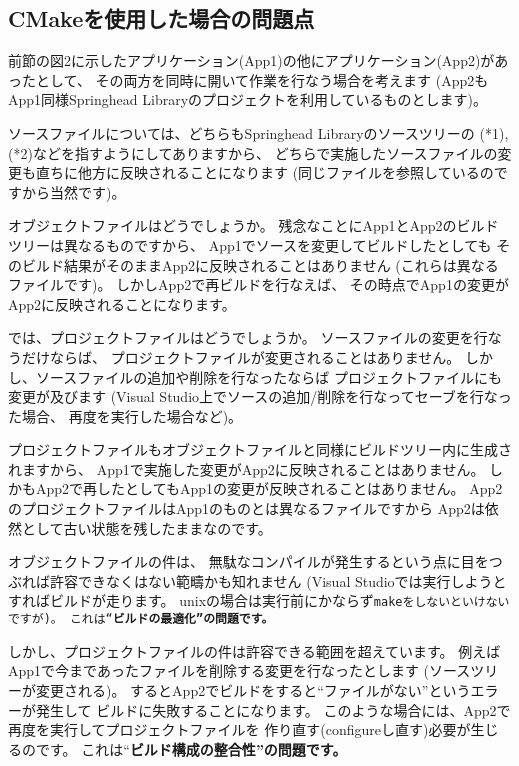 \newpage
\subsection{CMakeを使用した場合の問題点}
\label{subsec:WhatCMakeWillDoProblems}

前節の図2に示したアプリケーション(App1)の他にアプリケーション(App2)があったとして、
その両方を同時に開いて作業を行なう場合を考えます
(App2もApp1同様Springhead Libraryのプロジェクトを利用しているものとします)。

\medskip
ソースファイルについては、どちらもSpringhead Libraryのソースツリーの
(*1), (*2)などを指すようにしてありますから、
どちらで実施したソースファイルの変更も直ちに他方に反映されることになります
(同じファイルを参照しているのですから当然です)。

\medskip
オブジェクトファイルはどうでしょうか。
残念なことにApp1とApp2のビルドツリーは異なるものですから、
App1でソースを変更してビルドしたとしても
そのビルド結果がそのままApp2に反映されることはありません
(これらは異なるファイルです)。
しかしApp2で再ビルドを行なえば、
その時点でApp1の変更がApp2に反映されることになります。

\medskip
では、プロジェクトファイルはどうでしょうか。
ソースファイルの変更を行なうだけならば、
プロジェクトファイルが変更されることはありません。
しかし、ソースファイルの追加や削除を行なったならば
プロジェクトファイルにも変更が及びます
(Visual Studio上でソースの追加/削除を行なってセーブを行なった場合、
再度\cmake を実行した場合など)。

プロジェクトファイルもオブジェクトファイルと同様にビルドツリー内に生成されますから、
App1で実施した変更がApp2に反映されることはありません。
しかもApp2で再\cmake したとしてもApp1の変更が反映されることはありません。
App2のプロジェクトファイルはApp1のものとは異なるファイルですから
App2は依然として古い状態を残したままなのです。

\medskip
オブジェクトファイルの件は、
無駄なコンパイルが発生するという点に目をつぶれば許容できなくはない範疇かも知れません
(Visual Studioでは実行しようとすればビルドが走ります。
unixの場合は実行前にかならず\tt{make}をしないといけないですが)。
これは``\bf{ビルドの最適化}''の問題です。

しかし、プロジェクトファイルの件は許容できる範囲を超えています。
例えばApp1で今まであったファイルを削除する変更を行なったとします
(ソースツリーが変更される)。
するとApp2でビルドをすると``ファイルがない''というエラーが発生して
ビルドに失敗することになります。
このような場合には、App2で再度\cmake を実行してプロジェクトファイルを
作り直す(configureし直す)必要が生じるのです。
これは``\bf{ビルド構成の整合性}''の問題です。

